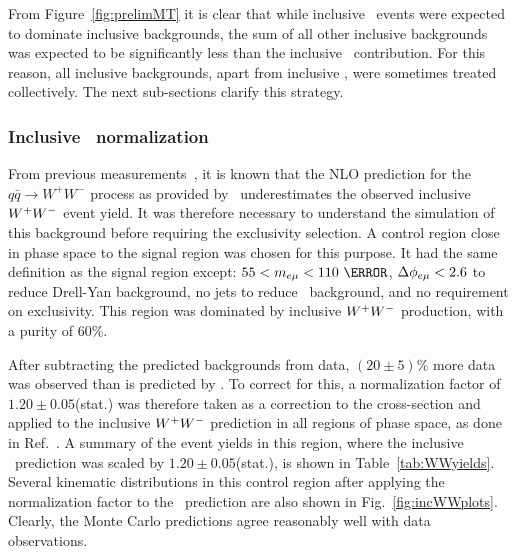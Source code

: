 \par From Figure~\ref{fig:prelimMT} it is clear that while inclusive \WW\ events were expected to dominate 
inclusive backgrounds, the sum of all other inclusive backgrounds was expected to be significantly less than the 
inclusive \WW\ contribution. For this reason, all inclusive backgrounds, apart from inclusive \WW, were sometimes 
treated collectively. The next sub-sections clarify this strategy.   

\subsubsection{Inclusive \WW\ normalization}
\par From previous measurements~\cite{ATLAS:2014aga,Aad:2016wpd}, it is known that the NLO prediction for the $q\bar{q}\rightarrow W^{+}W^{-}$
 process as provided by \PowhegPythiaEight\ underestimates the observed inclusive $W^+W^-$ event yield. 
It was therefore necessary to understand the simulation of this background before requiring the exclusivity selection. 
A control region close in phase space to the signal region was chosen for this purpose.
 It had the same definition as the signal region except: $55 < \memu < 110~\GeV$,  
$\Delta\phi_{e\mu}<2.6$ to reduce Drell-Yan background, no jets to reduce \ttbar\ background, and no requirement on exclusivity.
This region was dominated by inclusive $W^+W^-$ production, with a purity of 60\%. 

\par After subtracting the predicted backgrounds 
from data, $(20 \pm 5)\%$ more data was observed than is predicted
by \PowhegPythiaEight. To correct for this, a normalization factor of $1.20 \pm 0.05$(stat.)
was therefore taken as a correction to the cross-section and applied to the inclusive $W^+W^-$ prediction in all regions 
of phase space, as done in Ref.~\cite{ATLAS:2014aga}. A summary of the event yields in this region, where the 
inclusive \WW\ prediction was scaled by $1.20 \pm 0.05$(stat.), is shown in Table~\ref{tab:WWyields}.  
Several kinematic distributions in this control region
after applying the normalization factor to the \PowhegPythiaEight\ prediction are also 
shown in Fig.~\ref{fig:incWWplots}. Clearly, the Monte Carlo predictions agree reasonably 
well with data observations. 


